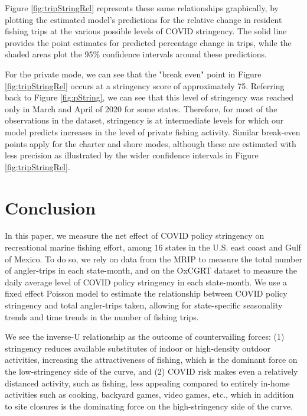 \documentclass[12pt]{article}
\begin{document}
Figure \ref{fig:tripStringRel} represents these same relationships
graphically, by plotting the estimated model's predictions for the
relative change in resident fishing trips at the various possible levels
of COVID stringency. The solid line provides the point estimates for
predicted percentage change in trips, while the shaded areas plot the
95\% confidence intervals around these predictions.

For the private mode, we can see that the "break even" point in Figure \ref{fig:tripStringRel} occurs at a stringency score of approximately 75. Referring back to Figure \ref{fig:pString}, we can see that this level of stringency was reached only in March and April of 2020 for some states. Therefore, for most of the observations in the dataset, stringency is at intermediate levels for which our model predicts increases in the level of private fishing activity. Similar break-even points apply for the charter and shore modes, although these are estimated with less precision as illustrated by the wider confidence intervals in Figure \ref{fig:tripStringRel}.


\section{Conclusion}

In this paper, we measure the net effect of COVID policy stringency on
recreational marine fishing effort, among 16 states in the U.S. east coast and Gulf of Mexico.
To do so, we rely on data from the MRIP to measure the total number of
angler-trips in each state-month, and on the OxCGRT dataset to measure
the daily average level of COVID policy stringency in each state-month. We
use a fixed effect Poisson model to estimate the 
relationship between COVID policy stringency and total angler-trips taken, allowing for state-specific seasonality trends and time
trends in the number of fishing trips.


We see the inverse-U relationship as the outcome of
countervailing forces: (1) stringency reduces available substitutes of
indoor or high-density outdoor activities, increasing the attractiveness
of fishing, which is the dominant force on the low-stringency side of
the curve, and (2) COVID risk makes even a relatively distanced
activity, such as fishing, less appealing compared to entirely in-home
activities such as cooking, backyard games, video games, etc., which in
addition to site closures is the dominating force on the high-stringency
side of the curve.
\end{document}
